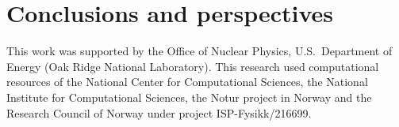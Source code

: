 \documentclass[aps,showpacs,floatfix,nofootinbib,preprintnumbers,superscriptaddress,amsmath,amssymb]{revtex4-1}
\begin{document}
\section{Conclusions and perspectives}\label{sec:conclusions}




\begin{acknowledgments}
  This work was supported by the Office of Nuclear Physics,
  U.S.~Department of Energy (Oak Ridge National Laboratory). This research used computational resources of the
  National Center for Computational Sciences, the National Institute
  for Computational Sciences, the Notur project in Norway and the Research Council of Norway under project ISP-Fysikk/216699. 
\end{acknowledgments}




\end{document}
